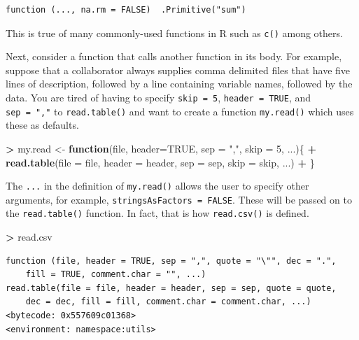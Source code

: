 \documentclass[
]{krantz}
\makeatletter
\newenvironment{Shaded}{\begin{snugshade}}{\end{snugshade}}
\newcommand{\ControlFlowTok}[1]{\textcolor[rgb]{0.27,0.27,0.27}{\textbf{#1}}}
\newcommand{\DataTypeTok}[1]{\textcolor[rgb]{0.27,0.27,0.27}{#1}}
\newcommand{\DecValTok}[1]{\textcolor[rgb]{0.06,0.06,0.06}{#1}}
\newcommand{\KeywordTok}[1]{\textcolor[rgb]{0.27,0.27,0.27}{\textbf{#1}}}
\newcommand{\NormalTok}[1]{#1}
\newcommand{\OperatorTok}[1]{\textcolor[rgb]{0.43,0.43,0.43}{\textbf{#1}}}
\newcommand{\OtherTok}[1]{\textcolor[rgb]{0.37,0.37,0.37}{#1}}
\newcommand{\StringTok}[1]{\textcolor[rgb]{0.5,0.5,0.5}{#1}}
\newenvironment{kframe}{%
\medskip{}
\setlength{\fboxsep}{.8em}
 \def\at@end@of@kframe{}%
 \ifinner\ifhmode%
  \def\at@end@of@kframe{\end{minipage}}%
  \begin{minipage}{\columnwidth}%
 \fi\fi%
 \def\FrameCommand##1{\hskip\@totalleftmargin \hskip-\fboxsep
 \colorbox{shadecolor}{##1}\hskip-\fboxsep
     \hskip-\linewidth \hskip-\@totalleftmargin \hskip\columnwidth}%
 \MakeFramed {\advance\hsize-\width
   \@totalleftmargin\z@ \linewidth\hsize
   \@setminipage}}%
 {\par\unskip\endMakeFramed%
 \at@end@of@kframe}
\renewenvironment{Shaded}{\begin{kframe}}{\end{kframe}}
\makeatother
\begin{document}
\begin{verbatim}
function (..., na.rm = FALSE)  .Primitive("sum")
\end{verbatim}

This is true of many commonly-used functions in R such as \texttt{c()} among others.

Next, consider a function that calls another function in its body. For example, suppose that a collaborator always supplies comma delimited files that have five lines of description, followed by a line containing variable names, followed by the data. You are tired of having to specify \texttt{skip\ =\ 5}, \texttt{header\ =\ TRUE}, and \texttt{sep\ =\ ","} to \texttt{read.table()} and want to create a function \texttt{my.read()} which uses these as defaults.

\begin{Shaded}
\begin{Highlighting}[]
\OperatorTok{\textgreater{}}\StringTok{ }\NormalTok{my.read \textless{}{-}}\StringTok{ }\ControlFlowTok{function}\NormalTok{(file, }\DataTypeTok{header=}\OtherTok{TRUE}\NormalTok{, }\DataTypeTok{sep =} \StringTok{","}\NormalTok{, }\DataTypeTok{skip =} \DecValTok{5}\NormalTok{, ...)\{}
\OperatorTok{+}\StringTok{     }\KeywordTok{read.table}\NormalTok{(}\DataTypeTok{file =}\NormalTok{ file, }\DataTypeTok{header =}\NormalTok{ header, }\DataTypeTok{sep =}\NormalTok{ sep, }\DataTypeTok{skip =}\NormalTok{ skip, ...)}
\OperatorTok{+}\StringTok{ }\NormalTok{\}}
\end{Highlighting}
\end{Shaded}

The \texttt{...} in the definition of \texttt{my.read()} allows the user to specify other arguments, for example, \texttt{stringsAsFactors\ =\ FALSE}. These will be passed on to the \texttt{read.table()} function. In fact, that is how \texttt{read.csv()} is defined.

\begin{Shaded}
\begin{Highlighting}[]
\OperatorTok{\textgreater{}}\StringTok{ }\NormalTok{read.csv}
\end{Highlighting}
\end{Shaded}

\begin{verbatim}
function (file, header = TRUE, sep = ",", quote = "\"", dec = ".", 
    fill = TRUE, comment.char = "", ...) 
read.table(file = file, header = header, sep = sep, quote = quote, 
    dec = dec, fill = fill, comment.char = comment.char, ...)
<bytecode: 0x557609c01368>
<environment: namespace:utils>
\end{verbatim}
\end{document}
